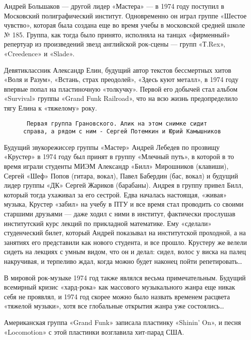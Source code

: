 Андрей Большаков — другой лидер «Мастера» — в 1974 году поступил в Московский полиграфический институт. Одновременно он
играл группе «Шестое чувство», которая была создана еще во время учебы в московской средней школе № 185. Группа, как
тогда было принято, исполняла на танцах «фирменный» репертуар из произведений звезд английской рок-сцены — групп
«Т.Rex», «Creedence» и «Slade».

Девятиклассник Александр Елин, будущий автор текстов бессмертных хитов «Воля и Разум», «Встань, страх преодолей»,
«Здесь куют металл», в 1974 году впервые попал на пластиночную «толкучку». Первой его добычей стал альбом «Survival»
группы «Grand Funk Railroad», что на всю жизнь предопределило тягу Елина к «тяжелому» року.

\begin{wrapfigure}{L}{0.48\textwidth}
    \caption*{\texttt{
        Первая группа Грановского. Алик на этом снимке сидит справа, а рядом с ним - Сергей Потемкин и Юрий Камышников
    }}
\end{wrapfigure}

Будущий звукорежиссер группы «Мастер» Андрей Лебедев по прозвищу «Крустер» в 1974 году был принят в группу «Млечный
путь», в которой в то время играли студенты МИЭМ Александр «Билл» Мирошников (клавиши), Сергей «Шеф» Попов (гитара,
вокал), Павел Бабердин (бас, вокал) и будущий лидер группы «ДК» Сергей Жариков (барабаны). Андрея в группу привел Билл,
который тогда ухаживал за его сестрой. Едва началась настоящая, «живая» музыка, Крустер «забил» на учебу в ПТУ и все
время стал проводить со своими старшими друзьями — даже ходил с ними в институт, фактически прослушав институтский курс
лекций по прикладной математике. Ему «сделали» студенческий билет, который Андрей показывал на институтской проходной,
а на занятиях его представили как нового студента, и все прошло. Крустеру же велели сидеть на лекциях с умным видом, что
он и делал: сидел, волос у виска на палец накручивая, и терпеливо ждал, когда можно будет наконец пойти
репетировать\ldots

В мировой рок-музыке 1974 год также являлся весьма примечательным. Будущий всемирный кризис «хард-рока» как массового
музыкального жанра еще никак себя не проявлял, и 1974 год скорее можно было назвать временем расцвета «тяжелой музыки»,
хотя все глобальные открытия жанра уже состоялись\ldots

Американская группа «Grand Funk» записала пластинку «Shinin' On», и песня «Locomotion» с этой пластинки возглавила
хит-парад США.

